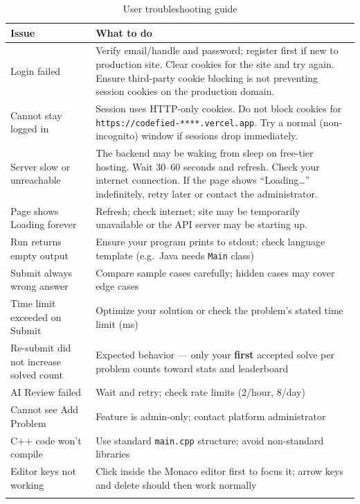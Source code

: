 \documentclass[11pt,a4paper]{article}
\newcommand{\appurl}{\texttt{https://codefied-****.vercel.app}}
\begin{document}
\begin{longtable}{@{}p{4cm}p{8.8cm}@{}}
\toprule
\textbf{Issue} & \textbf{What to do} \\
\midrule
\endhead
Login failed &
Verify email/handle and password; register first if new to production site. Clear cookies for the site and try again. Ensure third-party cookie blocking is not preventing session cookies on the production domain. \\
\addlinespace
Cannot stay logged in &
Session uses HTTP-only cookies. Do not block cookies for \appurl{}. Try a normal (non-incognito) window if sessions drop immediately. \\
\addlinespace
Server slow or unreachable &
The backend may be waking from sleep on free-tier hosting. Wait 30--60 seconds and refresh. Check your internet connection. If the page shows ``Loading\ldots'' indefinitely, retry later or contact the administrator. \\
\addlinespace
Page shows Loading forever &
Refresh; check internet; site may be temporarily unavailable or the API server may be starting up. \\
\addlinespace
Run returns empty output &
Ensure your program prints to stdout; check language template (e.g.\ Java needs \texttt{Main} class) \\
\addlinespace
Submit always wrong answer &
Compare sample cases carefully; hidden cases may cover edge cases \\
\addlinespace
Time limit exceeded on Submit &
Optimize your solution or check the problem's stated time limit (ms) \\
\addlinespace
Re-submit did not increase solved count &
Expected behavior --- only your \textbf{first} accepted solve per problem counts toward stats and leaderboard \\
\addlinespace
AI Review failed &
Wait and retry; check rate limits (2/hour, 8/day) \\
\addlinespace
Cannot see Add Problem &
Feature is admin-only; contact platform administrator \\
\addlinespace
C++ code won't compile &
Use standard \texttt{main.cpp} structure; avoid non-standard libraries \\
\addlinespace
Editor keys not working &
Click inside the Monaco editor first to focus it; arrow keys and delete should then work normally \\
\bottomrule
\caption{User troubleshooting guide}
\end{longtable}
\end{document}

